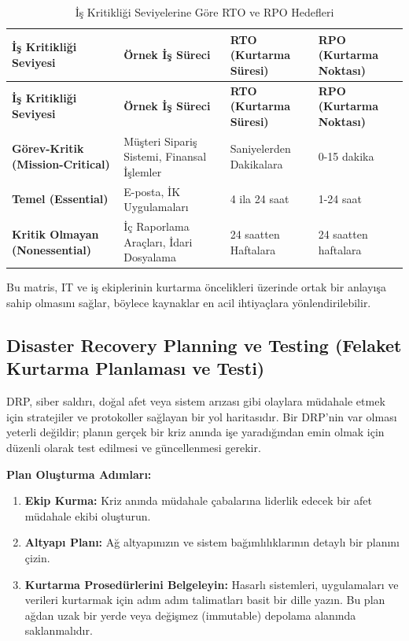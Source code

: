 \begin{longtable}{|>{\footnotesize}p{3cm}|>{\footnotesize}p{3cm}|>{\footnotesize}p{2.5cm}|>{\footnotesize}p{2.5cm}|}
\caption{İş Kritikliği Seviyelerine Göre RTO ve RPO Hedefleri}\\
\hline
\textbf{İş Kritikliği Seviyesi} & \textbf{Örnek İş Süreci} & \textbf{RTO (Kurtarma Süresi)} & \textbf{RPO (Kurtarma Noktası)} \\
\hline
\endfirsthead
\hline
\textbf{İş Kritikliği Seviyesi} & \textbf{Örnek İş Süreci} & \textbf{RTO (Kurtarma Süresi)} & \textbf{RPO (Kurtarma Noktası)} \\
\hline
\endhead
\textbf{Görev-Kritik (Mission-Critical)} & Müşteri Sipariş Sistemi, Finansal İşlemler & Saniyelerden Dakikalara & 0-15 dakika \\
\hline
\textbf{Temel (Essential)} & E-posta, İK Uygulamaları & 4 ila 24 saat & 1-24 saat \\
\hline
\textbf{Kritik Olmayan (Nonessential)} & İç Raporlama Araçları, İdari Dosyalama & 24 saatten Haftalara & 24 saatten haftalara \\
\hline
\end{longtable}

Bu matris, IT ve iş ekiplerinin kurtarma öncelikleri üzerinde ortak bir anlayışa sahip olmasını sağlar, böylece kaynaklar en acil ihtiyaçlara yönlendirilebilir.

\subsection{Disaster Recovery Planning ve Testing (Felaket Kurtarma Planlaması ve Testi)}

DRP, siber saldırı, doğal afet veya sistem arızası gibi olaylara müdahale etmek için stratejiler ve protokoller sağlayan bir yol haritasıdır. Bir DRP'nin var olması yeterli değildir; planın gerçek bir kriz anında işe yaradığından emin olmak için düzenli olarak test edilmesi ve güncellenmesi gerekir.

\textbf{Plan Oluşturma Adımları:}
\begin{enumerate}
    \item \textbf{Ekip Kurma:} Kriz anında müdahale çabalarına liderlik edecek bir afet müdahale ekibi oluşturun.
    \item \textbf{Altyapı Planı:} Ağ altyapınızın ve sistem bağımlılıklarının detaylı bir planını çizin.
    \item \textbf{Kurtarma Prosedürlerini Belgeleyin:} Hasarlı sistemleri, uygulamaları ve verileri kurtarmak için adım adım talimatları basit bir dille yazın. Bu plan ağdan uzak bir yerde veya değişmez (immutable) depolama alanında saklanmalıdır.
\end{enumerate}

